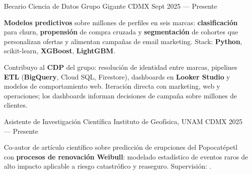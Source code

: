 \documentclass[10pt, letterpaper]{awesome-cv}
\begin{document}
\begin{cventries}

  \cventry
    {Becario Ciencia de Datos}
    {Grupo Gigante}
    {CDMX}
    {Sept 2025 — Presente}
    {
      \begin{cvitems}
        \item {\textbf{Modelos predictivos} sobre millones de perfiles en seis marcas: \textbf{clasificación} para churn, \textbf{propensión} de compra cruzada y \textbf{segmentación} de cohortes que personalizan ofertas y alimentan campañas de email marketing. Stack: \textbf{Python}, scikit-learn, \textbf{XGBoost}, \textbf{LightGBM}.}
        \item {Contribuyo al \textbf{CDP} del grupo: resolución de identidad entre marcas, pipelines \textbf{ETL} (\textbf{BigQuery}, Cloud SQL, Firestore), dashboards en \textbf{Looker Studio} y modelos de comportamiento web. Iteración directa con marketing, web y operaciones; los dashboards informan decisiones de campaña sobre millones de clientes.}
      \end{cvitems}
    }

  \cventry
    {Asistente de Investigación Científica }
    {Instituto de Geofísica, UNAM}
    {CDMX}
    {2025 — Presente}
    {
      \begin{cvitems}
        \item {Co-autor de artículo científico sobre predicción de erupciones del Popocatépetl con \textbf{procesos de renovación Weibull}: modelado estadístico de eventos raros de alto impacto aplicable a riesgo catastrófico y reaseguro. Supervisión: .}
      \end{cvitems}
    }

\end{cventries}

\end{document}
